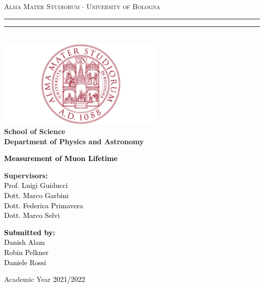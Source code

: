 
\setlength\parindent{0pt}

\begin{titlepage}
  \begin{center}
  {{\Large{\textsc{Alma Mater Studiorum $\cdot$ University of  Bologna}}}} 
  \rule[0.1cm]{10cm}{0.1mm}
  \rule[0.5cm]{10cm}{0.6mm}
  \\\vspace{3mm}
  \includegraphics[width=0.6\textwidth]{figures/unibo.png}
  \\ \vspace{3mm}
  {\small{\textbf{School of Science\\
  Department of Physics and Astronomy}}}
  \end{center}
  
  \vspace{23mm}
  
  \begin{center}\textcolor{black}{
  {\LARGE{\textbf{Measurement of Muon Lifetime}}}\\
  }\end{center}
  
  \vspace{50mm} \par \noindent
  
  \begin{minipage}[t]{0.47\textwidth}
  {\large{\textbf{Supervisors: }\vspace{2mm}\\\textcolor{black}{
    Prof. Luigi Guiducci \\
    Dott. Marco Garbini \\
    Dott. Federica Primavera\\
    Dott. Marco Selvi}}}
  \end{minipage}
  \hfill
  \begin{minipage}[t]{0.47\textwidth}\raggedleft \textcolor{black}{
  {\large{\textbf{Submitted by:}
  \vspace{2mm}\\
  \textcolor{black}{
Danish Alam\\
Robin Pelkner\\
Daniele Rossi}}}
  }
  \end{minipage}
  \vspace{2mm}
  \begin{center}
  Academic Year \textcolor{black}{2021/2022}
  \end{center}
  
  \end{titlepage}



